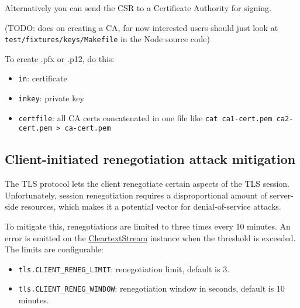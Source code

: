 Alternatively you can send the CSR to a Certificate Authority for
signing.

(TODO: docs on creating a CA, for now interested users should just look
at \texttt{test/fixtures/keys/Makefile} in the Node source code)

To create .pfx or .p12, do this:

\begin{Shaded}
\begin{Highlighting}[]
   \NormalTok{\textbackslash{}}
     
\end{Highlighting}
\end{Shaded}

\begin{itemize}
\item
  \texttt{in}: certificate
\item
  \texttt{inkey}: private key
\item
  \texttt{certfile}: all CA certs concatenated in one file like
  \texttt{cat ca1-cert.pem ca2-cert.pem \textgreater{} ca-cert.pem}
\end{itemize}

\subsection{Client-initiated renegotiation attack mitigation}

The TLS protocol lets the client renegotiate certain aspects of the TLS
session. Unfortunately, session renegotiation requires a disproportional
amount of server-side resources, which makes it a potential vector for
denial-of-service attacks.

To mitigate this, renegotiations are limited to three times every 10
minutes. An error is emitted on the
\hyperref[tls\_class\_tls\_cleartextstream]{CleartextStream} instance
when the threshold is exceeded. The limits are configurable:

\begin{itemize}
\item
  \texttt{tls.CLIENT\_RENEG\_LIMIT}: renegotiation limit, default is 3.
\item
  \texttt{tls.CLIENT\_RENEG\_WINDOW}: renegotiation window in seconds,
  default is 10 minutes.
\end{itemize}


